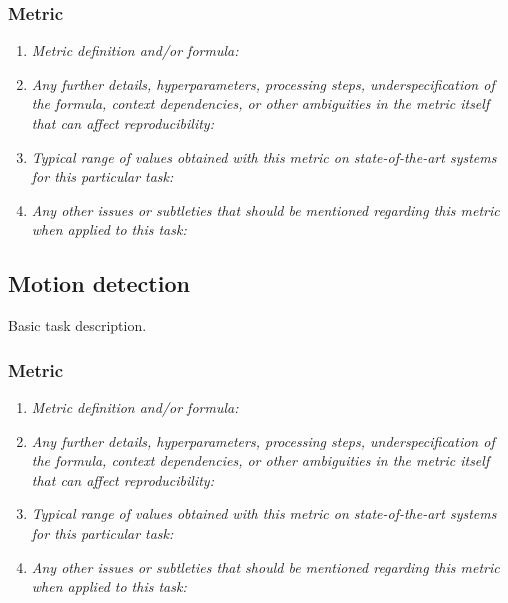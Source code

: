 \documentclass[a4paper,11pt]{article}
\begin{document}
        \subsubsection{Metric}
            \begin{enumerate}[label=\alph*.]
                \item \textit{Metric definition and/or formula:}
                \bigskip
                \item \textit{Any further details, hyperparameters, processing steps, underspecification of the formula, context dependencies, or other ambiguities in the metric itself that can affect reproducibility:}
                \bigskip
                \item \textit{Typical range of values obtained with this metric on state-of-the-art systems for this particular task:}
                \bigskip
                \item \textit{Any other issues or subtleties that should be mentioned regarding this metric when applied to this task:}
                \bigskip
            \end{enumerate}

    \subsection{Motion detection}
        Basic task description.
        \subsubsection{Metric}
            \begin{enumerate}[label=\alph*.]
                \item \textit{Metric definition and/or formula:}
                \bigskip
                \item \textit{Any further details, hyperparameters, processing steps, underspecification of the formula, context dependencies, or other ambiguities in the metric itself that can affect reproducibility:}
                \bigskip
                \item \textit{Typical range of values obtained with this metric on state-of-the-art systems for this particular task:}
                \bigskip
                \item \textit{Any other issues or subtleties that should be mentioned regarding this metric when applied to this task:}
                \bigskip
            \end{enumerate}
\end{document}
